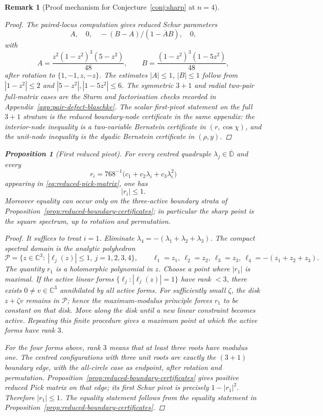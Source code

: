 \documentclass[11pt]{article}
\newtheorem{proposition}[theorem]{Proposition}
\newtheorem{remark}[theorem]{Remark}
\numberwithin{equation}{section}
\newcommand{\bbC}{\mathbb C}
\newcommand{\bbD}{\mathbb D}
\begin{document}
\begin{remark}[Proof mechanism for Conjecture~\ref{conj:sharp} at $n=4$]
\begin{proof}
The paired-locus computation gives reduced Schur parameters
\[
  A,\quad 0,\quad -(B-A)/(1-\overline A B),\quad 0,
\]
with
\[
  A=\frac{z^2(1-z^2)^3(5-z^2)}{48},\qquad
  B=\frac{(1-z^2)^3(1-5z^2)}{48},
\]
after rotation to \(\{1,-1,z,-z\}\).  The estimates
\(|A|\le1\), \(|B|\le1\) follow from \(|1-z^2|\le2\) and
\(|5-z^2|,|1-5z^2|\le6\).  The symmetric \(3{+}1\) and radial two-pair
full-matrix cases are the Sturm and factorisation checks recorded in
Appendix~\ref{app:pair-defect-blaschke}.  The scalar first-pivot statement on
the full \(3{+}1\) stratum is the reduced boundary-node certificate in the
same appendix: the interior-node inequality is a two-variable Bernstein
certificate in \((r,\cos\chi)\), and the unit-node inequality is the dyadic
Bernstein certificate in \((\rho,y)\).
\end{proof}

\begin{proposition}[First reduced pivot]\label{prop:first-reduced-pivot}
For every centred quadruple \(\lambda_j\in\overline{\bbD}\) and every
\[
  r_i=768^{-1}\bigl(c_1+c_2\lambda_i+c_3\lambda_i^2\bigr)
\]
appearing in \eqref{eq:reduced-pick-matrix}, one has
\[
  |r_i|\le1 .
\]
Moreover equality can occur only on the three-active boundary strata of
Proposition~\ref{prop:reduced-boundary-certificates}; in particular the sharp
point is the square spectrum, up to rotation and permutation.
\end{proposition}

\begin{proof}
It suffices to treat \(i=1\).  Eliminate
\(\lambda_4=-(\lambda_1+\lambda_2+\lambda_3)\).  The compact spectral domain is
the analytic polyhedron
\[
  \mathcal P=\{z\in\bbC^3:\ |\ell_j(z)|\le1,\ j=1,2,3,4\},
  \qquad
  \ell_1=z_1,\ \ell_2=z_2,\ \ell_3=z_3,\ \ell_4=-(z_1+z_2+z_3).
\]
The quantity \(r_1\) is a holomorphic polynomial in \(z\).  Choose a point
where \(|r_1|\) is maximal.  If the active linear forms
\(\{\ell_j:|\ell_j(z)|=1\}\) have rank \(<3\), there exists \(0\ne v\in\bbC^3\)
annihilated by all active forms.  For sufficiently small \(\zeta\), the disk
\(z+\zeta v\) remains in \(\mathcal P\); hence the maximum-modulus principle
forces \(r_1\) to be constant on that disk.  Move along the disk until a new
linear constraint becomes active.  Repeating this finite procedure gives a
maximum point at which the active forms have rank \(3\).

For the four forms above, rank \(3\) means that at least three roots have
modulus one.  The centred configurations with three unit roots are exactly the
\((3{+}1)\) boundary edge, with the all-circle case as endpoint, after rotation
and permutation.  Proposition~\ref{prop:reduced-boundary-certificates} gives
positive reduced Pick matrix on that edge; its first Schur pivot is precisely
\(1-|r_1|^2\).  Therefore \(|r_1|\le1\).  The equality statement follows from
the equality statement in Proposition~\ref{prop:reduced-boundary-certificates}.
\end{proof}


\end{remark}
\end{document}
